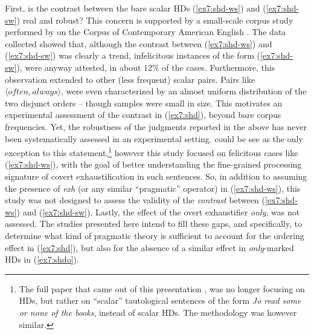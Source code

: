 First, is the contrast between the bare scalar HDs (\ref{ex7:shd-ws}) and (\ref{ex7:shd-sw}) real and robust? This concern is supported by a small-scale corpus study performed by \citet{Fox2018} on the Corpus of Contemporary American English \citep{Davies2008}. The data collected showed that, although the contrast between (\ref{ex7:shd-ws}) and (\ref{ex7:shd-sw}) was clearly a trend, infelicitous instances of the form (\ref{ex7:shd-sw}), were anyway attested, in about $12\%$ of the cases. Furthermore, this observation extended to other (less frequent) scalar pairs. Pairs like $\langle \textit{often}, \textit{always}\rangle$, were even characterized by an almost uniform distribution of the two disjunct orders -- though samples were small in size. This motivates an experimental assessment of the contrast in (\ref{ex7:shd}), beyond bare corpus frequencies. Yet, the robustness of the judgments reported in the above has never been systematically assessed in an
experimental setting. \citet{Chemla2013} could be see as the only exception to this statement,\footnote{The full paper that came out of this presentation \citep{Chemla2016}, was no longer focusing on HDs, but rather on ``scalar'' tautological sentences of the form \textit{Jo read some or none of the books}, instead of scalar HDs. The methodology was however similar.} however this study focused on felicitous cases like (\ref{ex7:shd-ws}), with the goal of better understanding the fine-grained processing signature of covert exhaustification in such sentences. So, in addition to assuming the presence of \textit{exh} (or any similar ``pragmatic'' operator) in (\ref{ex7:shd-ws}), this study was not designed to assess the validity of the \textit{contrast} between (\ref{ex7:shd-ws}) and (\ref{ex7:shd-sw}). Lastly, the effect of the overt exhaustifier \textit{only}, was not assessed.  The studies presented here intend to fill these gaps, and specifically, to determine what kind of pragmatic theory is sufficient to account for the ordering effect in (\ref{ex7:shd}), but also for the absence of a similar effect in \textit{only}-marked HDs in (\ref{ex7:shdo}).\\

